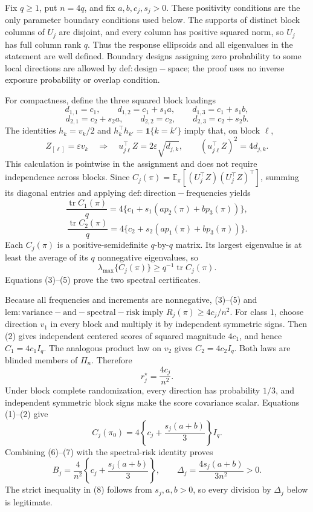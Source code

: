 Fix \(q\ge 1\), put \(n=4q\), and fix \(a,b,c_j,s_j>0\). These positivity conditions are the only parameter boundary conditions used below. The supports of distinct block columns of \(U_j\) are disjoint, and every column has positive squared norm, so \(U_j\) has full column rank \(q\). Thus the response ellipsoids and all eigenvalues in the statement are well defined. Boundary designs assigning zero probability to some local directions are allowed by \(\mathrm{def:design-space}\); the proof uses no inverse exposure probability or overlap condition.

For compactness, define the three squared block loadings
\[
d_{1,1}=c_1,\qquad d_{1,2}=c_1+s_1a,\qquad d_{1,3}=c_1+s_1b,
\]
\[
d_{2,1}=c_2+s_2a,\qquad d_{2,2}=c_2,\qquad d_{2,3}=c_2+s_2b. \tag{1}
\]
The identities \(h_k=v_k/2\) and \(h_k^\top h_{k'}=\mathbf 1\{k=k'\}\) imply that, on block \(\ell\),
\[
Z_{[\ell]}=\varepsilon v_k
\quad\Longrightarrow\quad
u_{j\ell}^\top Z=2\varepsilon\sqrt{d_{j,k}},
\qquad
(u_{j\ell}^\top Z)^2=4d_{j,k}. \tag{2}
\]
This calculation is pointwise in the assignment and does not require independence across blocks. Since \(C_j(\pi)=\mathbb E_\pi[(U_j^\top Z)(U_j^\top Z)^\top]\), summing its diagonal entries and applying \(\mathrm{def:direction-frequencies}\) yields
\[
\frac{\operatorname{tr}C_1(\pi)}q
=4\{c_1+s_1(ap_2(\pi)+bp_3(\pi))\}, \tag{3}
\]
\[
\frac{\operatorname{tr}C_2(\pi)}q
=4\{c_2+s_2(ap_1(\pi)+bp_3(\pi))\}. \tag{4}
\]
Each \(C_j(\pi)\) is a positive-semidefinite \(q\)-by-\(q\) matrix. Its largest eigenvalue is at least the average of its \(q\) nonnegative eigenvalues, so
\[
\lambda_{\max}\{C_j(\pi)\}\ge q^{-1}\operatorname{tr}C_j(\pi). \tag{5}
\]
Equations (3)--(5) prove the two spectral certificates.

Because all frequencies and increments are nonnegative, (3)--(5) and \(\mathrm{lem:variance-and-spectral-risk}\) imply \(R_j(\pi)\ge 4c_j/n^2\). For class \(1\), choose direction \(v_1\) in every block and multiply it by independent symmetric signs. Then (2) gives independent centered scores of squared magnitude \(4c_1\), and hence \(C_1=4c_1I_q\). The analogous product law on \(v_2\) gives \(C_2=4c_2I_q\). Both laws are blinded members of \(\Pi_n\). Therefore
\[
r_j^\star=\frac{4c_j}{n^2}. \tag{6}
\]
Under block complete randomization, every direction has probability \(1/3\), and independent symmetric block signs make the score covariance scalar. Equations (1)--(2) give
\[
C_j(\pi_0)=4\left\{c_j+\frac{s_j(a+b)}3\right\}I_q. \tag{7}
\]
Combining (6)--(7) with the spectral-risk identity proves
\[
B_j=\frac4{n^2}\left\{c_j+\frac{s_j(a+b)}3\right\},
\qquad
\Delta_j=\frac{4s_j(a+b)}{3n^2}>0. \tag{8}
\]
The strict inequality in (8) follows from \(s_j,a,b>0\), so every division by \(\Delta_j\) below is legitimate.

